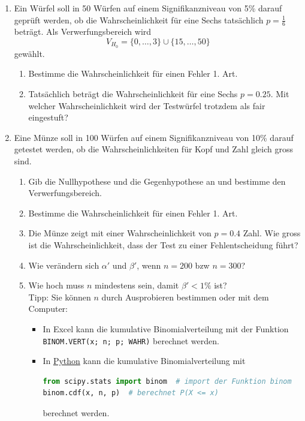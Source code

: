\clearpage
\begin{ueb}
    {}{}
    \begin{enumerate}
        \item Ein Würfel soll in 50 Würfen auf einem Signifikanzniveau von 5\% darauf geprüft werden, ob die Wahrscheinlichkeit für eine Sechs tatsächlich \( p = \frac{1}{6} \) beträgt. Als Verwerfungsbereich wird
              \[
                  V_{H_0} = \{0, \ldots, 3\} \cup \{15, \ldots, 50\}
              \]
              gewählt.
              \begin{enumerate}
                  \item Bestimme die Wahrscheinlichkeit für einen Fehler 1. Art.
                  \item Tatsächlich beträgt die Wahrscheinlichkeit für eine Sechs \( p = 0.25 \). Mit welcher Wahrscheinlichkeit wird der Testwürfel trotzdem als fair eingestuft?
              \end{enumerate}

        \item Eine Münze soll in 100 Würfen auf einem Signifikanzniveau von 10\% darauf getestet werden, ob die Wahrscheinlichkeiten für Kopf und Zahl gleich gross sind.
              \begin{enumerate}
                  \item Gib die Nullhypothese und die Gegenhypothese an und bestimme den Verwerfungsbereich.
                  \item Bestimme die Wahrscheinlichkeit für einen Fehler 1. Art.
                  \item Die Münze zeigt mit einer Wahrscheinlichkeit von \( p = 0.4 \) Zahl. Wie gross ist die Wahrscheinlichkeit, dass der Test zu einer Fehlentscheidung führt?
                  \item Wie verändern sich  \( \alpha' \) und \( \beta' \), wenn \(n=200\) bzw \(n=300\)?
                  \item Wie hoch muss \(n\) mindestens sein, damit \( \beta'<1\%\) ist?
                        \\ Tipp: Sie können \(n\) durch Ausprobieren bestimmen oder mit dem Computer:
                        \begin{itemize}
                            \item In Excel kann die kumulative Binomialverteilung mit der Funktion \texttt{BINOM.VERT(x; n; p; WAHR)} berechnet werden.
                            \item In \href{https://webtigerpython.ethz.ch}{Python} kann die kumulative Binomialverteilung mit
                                  \begin{lstlisting}[language = Python]
from scipy.stats import binom  # import der Funktion binom
binom.cdf(x, n, p)  # berechnet P(X <= x) 
\end{lstlisting}
                                  berechnet werden.
                        \end{itemize}

              \end{enumerate}
    \end{enumerate}

\end{ueb}

